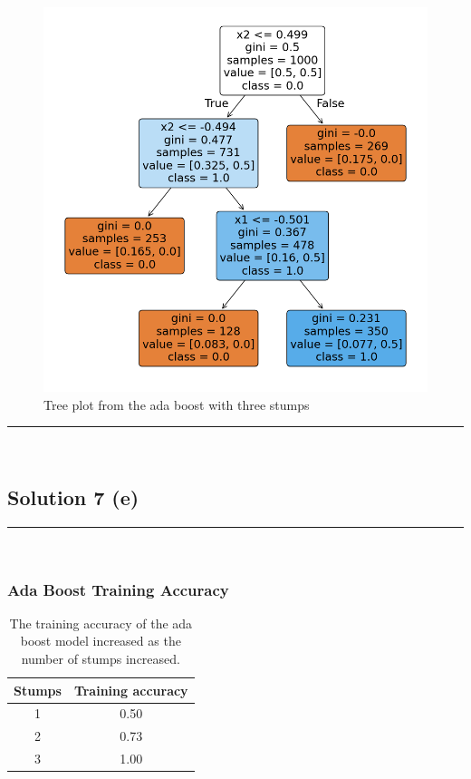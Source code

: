 \documentclass{article}
\begin{document}
\begin{center}
  \begin{figure}[H]
    \includegraphics{hw9_q7d_ada_stumps_3.png}
    \caption{Tree plot from the ada boost with three stumps}
  \end{figure}
\end{center}


\noindent\rule{\textwidth}{0.4pt}\\

\newpage

\subsection*{Solution 7 (e)}
\noindent\rule{\textwidth}{0.4pt}\\

\subsubsection*{Ada Boost Training Accuracy}
\begin{table}[h!]               
  \centering                    
  \begin{tabular}{|c|c|}
    \hline
    Stumps & Training accuracy \\ \hline
    1 & 0.50 \\ 
    2 & 0.73 \\ 
    3 & 1.00 \\ \hline
  \end{tabular}
  \caption{The training accuracy of the ada boost model increased as the number of stumps increased.}   
  \label{tab:trainacc}
\end{table}
\end{document}
